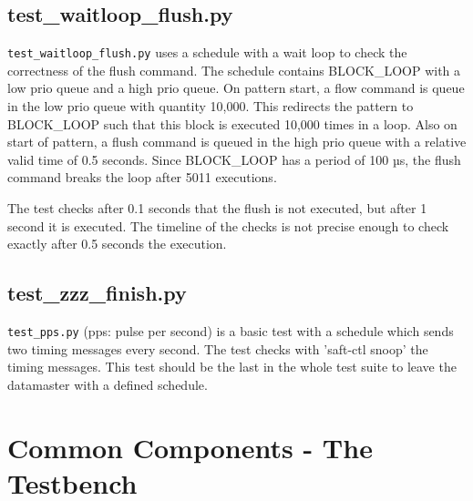 \documentclass[12pt,a4paper]{report}
\begin{document}
\section{test\_waitloop\_flush.py}
\texttt{test\_waitloop\_flush.py} uses a schedule with a wait loop to check
the correctness of the flush command. The schedule contains BLOCK\_LOOP with a low
prio queue and a high prio queue. On pattern start, a flow command is queue in
the low prio queue with quantity 10,000. This redirects the pattern to
BLOCK\_LOOP such that this block is executed 10,000 times in a loop. Also
on start of pattern, a flush command is queued in the high prio queue with a
relative valid time of 0.5 seconds. Since BLOCK\_LOOP has a period of 100 µs,
the flush command breaks the loop after 5011 executions.

The test checks after 0.1 seconds that the flush is not executed, but after 1 second
it is executed. The timeline of the checks is not precise enough to check
exactly after 0.5 seconds the execution.

\section{test\_zzz\_finish.py}
\texttt{test\_pps.py} (pps: pulse per second) is a basic test with a
schedule which sends two timing messages every second. The test checks
with 'saft-ctl snoop' the timing messages. This test should be the last
in the whole test suite to leave the datamaster with a defined schedule.

\chapter{Common Components - The Testbench}
\end{document}
